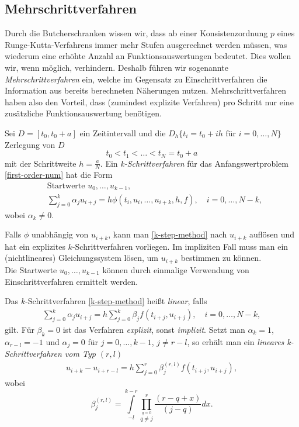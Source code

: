 \subsection{Mehrschrittverfahren}
Durch die Butcherschranken wissen wir, dass ab einer Konsistenzordnung $p$ eines Runge-Kutta-Verfahrens immer mehr
Stufen ausgerechnet werden müssen, was wiederum eine erhöhte Anzahl an Funktionsauswertungen bedeutet. Dies wollen wir,
wenn möglich, verhindern. Deshalb führen wir sogenannte \textit{Mehrschrittverfahren} ein, welche im Gegensatz zu
Einschrittverfahren die Information aus bereits berechneten Näherungen nutzen. Mehrschrittverfahren haben also den
Vorteil, dass (zumindest explizite Verfahren) pro Schritt nur eine zusätzliche Funktionsauswertung benötigen.
\begin{definition}
    Sei $D = \left[ t_0, t_0 +a \right]$ ein Zeitintervall und die $D_h \{ t_i = t_0 + ih \text{ für } i = 0, \dots, N\}$
    Zerlegung von $D$
    \[
        t_0 < t_1 < \dots < t_N = t_0 + a
    \]
    mit der Schrittweite $h = \frac{a}{N}$. Ein {\em k-Schrittverfahren} für das Anfangswertproblem
    \eqref{first-order-num} hat die Form
    \begin{align}
        \label{k-step-method}
        &\text{Startwerte } u_0, \dots, u_{k-1}, \nonumber \\
        & \sum_{j=0}^{k} \alpha_j u_{i+j} = h \phi(t_i, u_i, \dots, u_{i+k},h,f), \quad i=0,\dots,N-k,
    \end{align}
    wobei $\alpha_k \neq 0$.
\end{definition}
Falls $\phi$ unabhängig von $u_{i+k}$, kann man \eqref{k-step-method} nach $u_{i+k}$
auflösen und hat ein explizites $k$-Schrittverfahren vorliegen. Im impliziten Fall muss man ein (nichtlineares)
Gleichungssystem lösen, um $u_{i+k}$ bestimmen zu können.\\
Die Startwerte $u_0, \dots, u_{k-1}$ können durch einmalige Verwendung von Einschrittverfahren ermittelt werden.
\begin{definition}
    Das $k$-Schrittverfahren \eqref{k-step-method} heißt {\em linear}, falls
    \begin{align}
        \label{k-step-linear}
        \sum_{j=0}^{k} \alpha_j u_{i+j} = h \sum_{j=0}^{k} \beta_j f(t_{i+j}, u_{i+j}), \quad i = 0, \dots, N-k,
    \end{align}
    gilt. Für $\beta_k = 0$ ist das Verfahren {\em explizit}, sonst {\em implizit}.
    Setzt man $\alpha_k=1$, $\alpha_{r-l}=-1$ und $\alpha_j=0$ für $j=0,\dots,k-1$, $j \neq r-l$, so erhält man ein
    \textit{lineares k-Schrittverfahren vom Typ $(r,l)$}
    \begin{align}
        \label{k-step-rl}
        u_{i+k}-u_{i+r-l} = h \sum_{j=0}^{r} \beta_j^{(r,l)} f(t_{i+j},u_{i+j}),
    \end{align}
    wobei
    \[
        \beta_j^{(r,l)} = \int\limits_{-l}^{k-r} \prod\limits_{\overset{q=0}{q \neq j}}^{r} \frac{(r-q+x)}{(j-q)}dx.
    \]
\end{definition}
